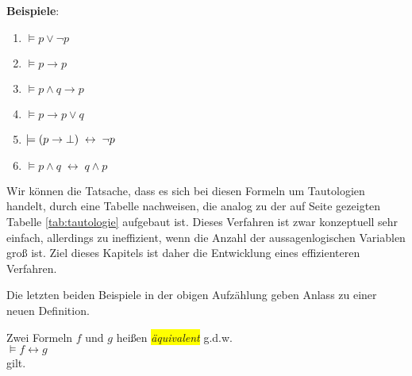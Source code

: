 \noindent
\textbf{Beispiele}:
\begin{enumerate}
\item $\models p \vee \neg p$
\item $\models p \rightarrow p$
\item $\models p \wedge q \rightarrow p$
\item $\models p \rightarrow p \vee q$
\item $\models (p \rightarrow \bot) \;\leftrightarrow\; \neg p$
\item $\models p \wedge q \;\leftrightarrow\; q \wedge p$
\end{enumerate}
Wir k\"{o}nnen die Tatsache, dass es sich bei diesen Formeln um Tautologien handelt, durch
eine Tabelle nachweisen, die analog zu der auf Seite \pageref{tab:tautologie} gezeigten
Tabelle \ref{tab:tautologie} aufgebaut ist.  Dieses Verfahren ist zwar konzeptuell sehr
einfach, allerdings zu ineffizient, wenn die Anzahl der aussagenlogischen Variablen gro\ss{}
ist.  Ziel dieses Kapitels ist daher die Entwicklung eines effizienteren Verfahren.

Die letzten beiden Beispiele in der obigen Aufz\"{a}hlung geben Anlass zu einer neuen Definition.
\begin{Definition}[\"{A}quivalent]
  Zwei Formeln $f$ und $g$ hei\ss{}en \colorbox{yellow}{\emph{\"{a}quivalent}} g.d.w.  \\[0.2cm]
  \hspace*{1.3cm} $\models f \leftrightarrow g$ 
  \\[0.1cm]
  gilt.
  \eox
\end{Definition}

